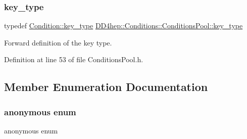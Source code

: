 \subsubsection{\texorpdfstring{key\+\_\+type}{key\_type}}
{\footnotesize\ttfamily typedef \hyperlink{class_d_d4hep_1_1_conditions_1_1_condition_a7528efa762e8cc072ef80ea67c3531f9}{Condition\+::key\+\_\+type} \hyperlink{class_d_d4hep_1_1_conditions_1_1_conditions_pool_af0032de2b90b6bab00bf857f6078daaf}{D\+D4hep\+::\+Conditions\+::\+Conditions\+Pool\+::key\+\_\+type}}



Forward definition of the key type. 



Definition at line 53 of file Conditions\+Pool.\+h.



\subsection{Member Enumeration Documentation}
\hypertarget{class_d_d4hep_1_1_conditions_1_1_conditions_pool_a3f11aa918cf5bb4fdc5958cfee1db0d6}{}\label{class_d_d4hep_1_1_conditions_1_1_conditions_pool_a3f11aa918cf5bb4fdc5958cfee1db0d6} 
\subsubsection{\texorpdfstring{anonymous enum}{anonymous enum}}
{\footnotesize\ttfamily anonymous enum}

